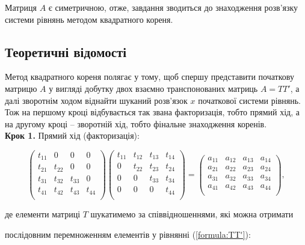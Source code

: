 \documentclass[a4paper,14pt]{extarticle} %
\begin{document}
Матриця $A$ є симетричною, отже, завдання зводиться до 
знаходження розв'язку системи рівнянь методом квадратного кореня.

\subsection*{Теоретичні відомості}

Метод квадратного кореня полягає у тому, щоб спершу представити 
початкову матрицю $A$ у вигляді добутку двох взаємно транспонованих матриць $A=TT'$, 
а далі зворотнім ходом віднайти шуканий розв'язок $x$ початкової системи рівнянь. 
Тож на першому кроці відбувається так звана факторизація, тобто прямий хід, 
а на другому кроці -- зворотній хід, тобто фінальне знаходження коренів. \\

\textbf{Крок 1.} Прямий хід (факторизація):

\begin{equation}
\label{formula:TT'}
    \begin{pmatrix}
        t_{11} & 0 & 0 & 0 \\
        t_{21} & t_{22} & 0 & 0 \\
        t_{31} & t_{32} & t_{33} & 0 \\
        t_{41} & t_{42} & t_{43} & t_{44} \\
    \end{pmatrix}
    \begin{pmatrix}
        t_{11} & t_{12} & t_{13} & t_{14} \\
        0 & t_{22} & t_{23} & t_{24} \\
        0 & 0 & t_{33} & t_{34} \\
        0 & 0 & 0 & t_{44} \\
    \end{pmatrix} = 
    \begin{pmatrix}
        a_{11} & a_{12} & a_{13} & a_{14} \\
        a_{21} & a_{22} & a_{23} & a_{24} \\
        a_{31} & a_{32} & a_{33} & a_{34} \\
        a_{41} & a_{42} & a_{43} & a_{44} \\
    \end{pmatrix},
\end{equation}

\newpage
де елементи матриці $T$ шукатимемо за співвідношеннями, 
які можна отримати \par послідовним перемноженням елементів у рівнянні 
(\ref{formula:TT'}):
\end{document}
